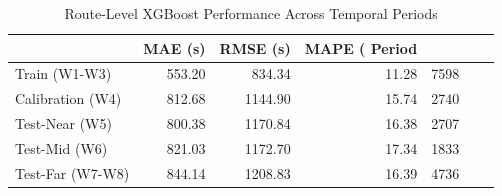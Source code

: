 \begin{table}
\caption{Route-Level XGBoost Performance Across Temporal Periods}
\label{tab:route_xgboost_performance}
\begin{tabular}{lrrrr}
\toprule
 & MAE (s) & RMSE (s) & MAPE (%
Period &  &  &  &  \\
\midrule
Train (W1-W3) & 553.20 & 834.34 & 11.28 & 7598 \\
Calibration (W4) & 812.68 & 1144.90 & 15.74 & 2740 \\
Test-Near (W5) & 800.38 & 1170.84 & 16.38 & 2707 \\
Test-Mid (W6) & 821.03 & 1172.70 & 17.34 & 1833 \\
Test-Far (W7-W8) & 844.14 & 1208.83 & 16.39 & 4736 \\
\bottomrule
\end{tabular}
\end{table}
